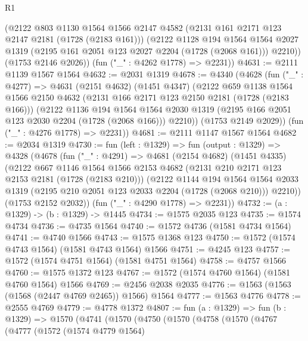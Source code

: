 \begin{lexlean}{R1}
\begin{coremodule}
        (@2122
          @803
          @1130
          @1564
          @1566
          @2147
          @4582
          (@2131 @161 @2171 @123 @2147 @2181 (@1728 (@2183 @161)))
          (@2122
            @1128
            @194
            @1564
            @1564
            @2027
            @1319
            (@2195 @161 @2051 @123 @2027 @2204 (@1728 (@2068 @161)))
            @2210))
        (@1753 @2146 @2026))
      (fun ("_" : @4262 @1778) => @2231))
@4631 := @2111 @1139 @1567 @1564
@4632 := @2031 @1319
@4678 := @4340
    (@4628
      (fun ("_" : @4277) =>
      @4631
        (@2151 @4632)
        (@1451 @4347)
        (@2122
          @659
          @1138
          @1564
          @1566
          @2150
          @4632
          (@2131 @166 @2171 @123 @2150 @2181 (@1728 (@2183 @166)))
          (@2122
            @1136
            @194
            @1564
            @1564
            @2030
            @1319
            (@2195 @166 @2051 @123 @2030 @2204 (@1728 (@2068 @166)))
            @2210))
        (@1753 @2149 @2029))
      (fun ("_" : @4276 @1778) => @2231))
@4681 := @2111 @1147 @1567 @1564
@4682 := @2034 @1319
@4730 := fun (left : @1329) =>
  fun (output : @1329) =>
  @4328
    (@4678
      (fun ("_" : @4291) =>
      @4681
        (@2154 @4682)
        (@1451 @4335)
        (@2122
          @667
          @1146
          @1564
          @1566
          @2153
          @4682
          (@2131 @210 @2171 @123 @2153 @2181 (@1728 (@2183 @210)))
          (@2122
            @1144
            @194
            @1564
            @1564
            @2033
            @1319
            (@2195 @210 @2051 @123 @2033 @2204 (@1728 (@2068 @210)))
            @2210))
        (@1753 @2152 @2032))
      (fun ("_" : @4290 @1778) => @2231))
@4732 := (a : @1329) -> (b : @1329) -> @1445
@4734 := @1575 @2035 @123
@4735 := @1574 @4734
@4736 := @4735 @1564
@4740 := @1572 @4736 (@1581 @4734 @1564)
@4741 := @4740 @1566
@4743 := @1575 @1368 @123
@4750 := @1572 (@1574 @4743 @1564) (@1581 @4743 @1564) @1566
@4751 := @4245 @123
@4757 := @1572 (@1574 @4751 @1564) (@1581 @4751 @1564)
@4758 := @4757 @1566
@4760 := @1575 @1372 @123
@4767 := @1572 (@1574 @4760 @1564) (@1581 @4760 @1564) @1566
@4769 := @2456 @2038 @2035
@4776 := @1563 (@1563 (@1568 (@2447 @4769 @2465)) @1566) @1564
@4777 := @1563 @4776
@4778 := @2555 @4769
@4779 := @4778 @1372
@4807 := fun (a : @1329) =>
  fun (b : @1329) =>
  @1570
    (@4741
      (@1570
        (@4750
          (@1570
            (@4758
              (@1570
                (@4767
                  (@4777
                    (@1572
                      (@1574 @4779 @1564)

\end{coremodule}
\end{lexlean}
